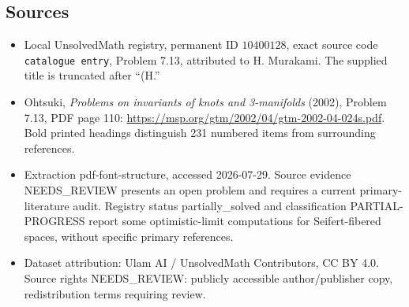 \documentclass[11pt]{article}
\begin{document}
\subsection{Sources}
\begin{itemize}
\item Local UnsolvedMath registry, permanent ID \(10400128\), exact source code \texttt{catalogue entry}, Problem 7.13, attributed to H. Murakami. The supplied title is truncated after ``(H.''
\item Ohtsuki, \emph{Problems on invariants of knots and 3-manifolds} (2002), Problem 7.13, PDF page 110: \url{https://msp.org/gtm/2002/04/gtm-2002-04-024s.pdf}. Bold printed headings distinguish 231 numbered items from surrounding references.
\item Extraction pdf-font-structure, accessed 2026-07-29. Source evidence NEEDS\_REVIEW presents an open problem and requires a current primary-literature audit. Registry status partially\_solved and classification PARTIAL-PROGRESS report some optimistic-limit computations for Seifert-fibered spaces, without specific primary references.
\item Dataset attribution: Ulam AI / UnsolvedMath Contributors, CC BY 4.0. Source rights NEEDS\_REVIEW: publicly accessible author/publisher copy, redistribution terms requiring review.
\end{itemize}
\end{document}
